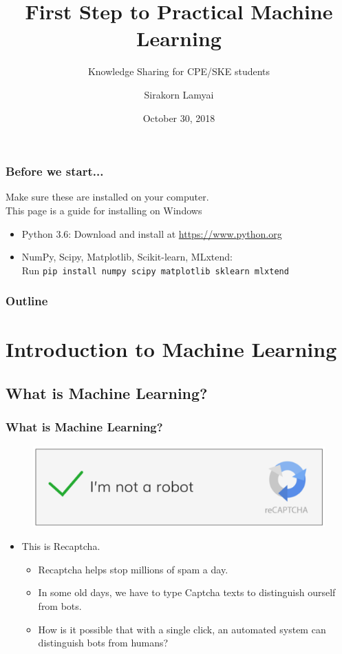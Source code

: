\documentclass[aspectratio=169]{beamer}
\title{First Step to Practical Machine Learning}
\subtitle{Knowledge Sharing for CPE/SKE students}
\author{Sirakorn Lamyai}
\institute{Student, Kasetsart U.}
\date{October 30, 2018}
\begin{document}
\begin{frame}
	\titlepage
\end{frame}

\begin{frame}
	\frametitle{Before we start...}
	Make sure these are installed on your computer.\\
	{\tiny This page is a guide for installing on Windows}
	
	\begin{itemize}
		\item Python 3.6: Download and install at \url{https://www.python.org}
		\item NumPy, Scipy, Matplotlib, Scikit-learn, MLxtend:\\
		Run \texttt{pip install numpy scipy matplotlib sklearn mlxtend}
	\end{itemize}
\end{frame}

\begin{frame}
	\frametitle{Outline}
	\tableofcontents
\end{frame}

\section{Introduction to Machine Learning}

\subsection{What is Machine Learning?}

\begin{frame}
	\frametitle{What is Machine Learning?}
	\pause
	\begin{figure}
		\includegraphics[scale=0.4]{imgs/recaptcha.png}
	\end{figure}
	\begin{itemize}
		\pause
		\item This is Recaptcha.
		      \begin{itemize}
			      \pause
			      \item Recaptcha helps stop millions of spam a day.
			            \pause
			      \item In some old days, we have to type Captcha texts to distinguish ourself from bots.
			            \pause
			      \item How is it possible that with a single click, an automated system can distinguish bots from humans?
		      \end{itemize}
	\end{itemize}
\end{frame}
\end{document}
